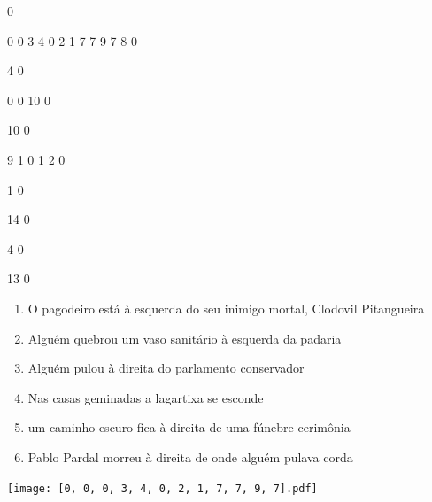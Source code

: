 \documentclass[12pt]{article}
\begin{document}
		\vfill  
		  
{
	0	%

	0	%
	0	%
	3	%
	4	%
	0	%
	2	%
	1	%
	7	%
	7	%
	9	%
	7	%
	8	%
	0	%

	4	%
	0	%

	0	%
	0	%
	10	%
	0	%

	10	%
	0	%

	9	%
	1	%
	0	%
	1	%
	2	%
	0	%

	1	%
	0	%

	14	%
	0	%

	4	%
	0	%

	13	%
	0	%

}	  
		    	

		 

\pagebreak


	\begin{enumerate}
		  \sffamily %
		  \large %


\vfill \item
O pagodeiro está	%
à esquerda
do seu inimigo mortal, Clodovil Pitangueira	%

\vfill \item
Alguém quebrou um vaso sanitário	%
à esquerda
da padaria	%

\vfill \item
Alguém pulou	%
à direita
do parlamento conservador	%

\vfill \item
Nas casas geminadas	%
a lagartixa se esconde	%

\vfill \item
um caminho escuro fica	%
à direita
de uma fúnebre cerimônia	%

\vfill \item
Pablo Pardal morreu	%
à direita
de onde alguém pulava corda	%
	\end{enumerate}
		  
		  \hfill

		  \vfill

\texttt{[image: [0, 0, 0, 3, 4, 0, 2, 1, 7, 7, 9, 7].pdf]}


	\hfill	  	  
\end{document}
